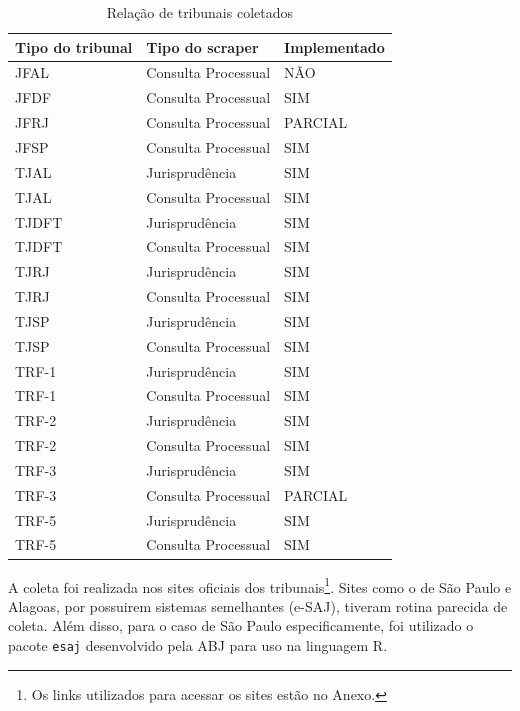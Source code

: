 \documentclass[12pt]{article}
\begin{document}
\begin{table}

\caption{\label{tab:unnamed-chunk-2}Relação de tribunais coletados}
\centering
\begin{tabular}[t]{l|l|l}
\hline
Tipo do tribunal & Tipo do scraper & Implementado\\
\hline
JFAL & Consulta Processual & NÃO\\
\hline
JFDF & Consulta Processual & SIM\\
\hline
JFRJ & Consulta Processual & PARCIAL\\
\hline
JFSP & Consulta Processual & SIM\\
\hline
TJAL & Jurisprudência & SIM\\
\hline
TJAL & Consulta Processual & SIM\\
\hline
TJDFT & Jurisprudência & SIM\\
\hline
TJDFT & Consulta Processual & SIM\\
\hline
TJRJ & Jurisprudência & SIM\\
\hline
TJRJ & Consulta Processual & SIM\\
\hline
TJSP & Jurisprudência & SIM\\
\hline
TJSP & Consulta Processual & SIM\\
\hline
TRF-1 & Jurisprudência & SIM\\
\hline
TRF-1 & Consulta Processual & SIM\\
\hline
TRF-2 & Jurisprudência & SIM\\
\hline
TRF-2 & Consulta Processual & SIM\\
\hline
TRF-3 & Jurisprudência & SIM\\
\hline
TRF-3 & Consulta Processual & PARCIAL\\
\hline
TRF-5 & Jurisprudência & SIM\\
\hline
TRF-5 & Consulta Processual & SIM\\
\hline
\end{tabular}
\end{table}

A coleta foi realizada nos sites oficiais dos tribunais\footnote{Os
  links utilizados para acessar os sites estão no Anexo.}. Sites como o
de São Paulo e Alagoas, por possuirem sistemas semelhantes (e-SAJ),
tiveram rotina parecida de coleta. Além disso, para o caso de São Paulo
especificamente, foi utilizado o pacote \texttt{esaj} desenvolvido pela
ABJ para uso na linguagem R.
\end{document}
